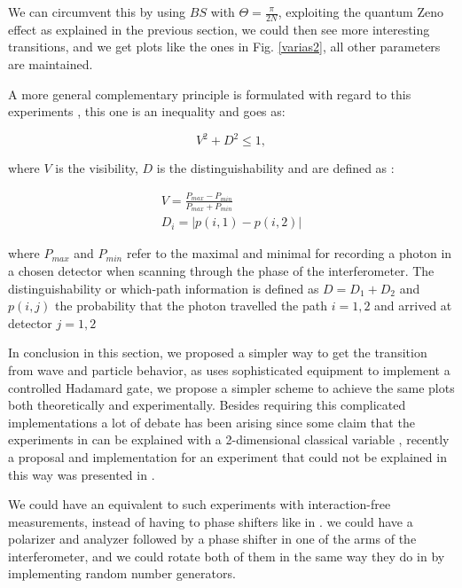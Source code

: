 \documentclass{book}
\begin{document}
We can circumvent this by using $BS$ with $\Theta=\frac{\pi}{2N}$, exploiting the quantum Zeno effect as explained in the previous section, we could then see more interesting transitions, and we get plots like the ones in Fig. \ref{varias2}, all other parameters are maintained.



A more general complementary principle is formulated with regard to this experiments \cite{Ma}, this one is an inequality and goes as:

\begin{equation}
 V^{2} + D^{2} \leq 1,
\end{equation}

where $V$ is the visibility, $D$ is the distinguishability and are defined as :

\begin{align}
 V= \frac{P_{max}-P_{min}}{P_{max}+P_{min}}\\
 D_{i}=|p(i,1)-p(i,2)|
\end{align}

where $P_{max}$ and $P_{min}$ refer to the maximal and minimal for recording a photon in a chosen detector when scanning through the phase of the interferometer. The distinguishability or which-path information is defined as $D=D_{1}+D_{2}$ and $p(i,j)$ the probability that the photon travelled the path $i=1,2$ and arrived at detector $j=1,2$


In conclusion in this section, we proposed a simpler way to get the transition from wave and particle behavior, as \cite{Kaiser2012,Peruzzo} uses sophisticated equipment to implement a controlled Hadamard gate, we propose a simpler scheme to achieve the same plots both theoretically and experimentally. Besides requiring this complicated implementations a lot of debate has been arising since some claim that the experiments in \cite{Kaiser2012,Peruzzo}  can be explained with a 2-dimensional classical variable \cite{Rossi,Chaves}, recently a proposal and implementation for an experiment that could not be explained in this way was presented in \cite{Polino}.

We could have an equivalent to such experiments with interaction-free measurements, instead of having to phase shifters like in \cite{Polino}. we could have a polarizer and analyzer followed by a phase shifter in one of the arms of the interferometer, and we could rotate both of them in the same way they do in \cite{Polino} by implementing random number generators.
\end{document}

